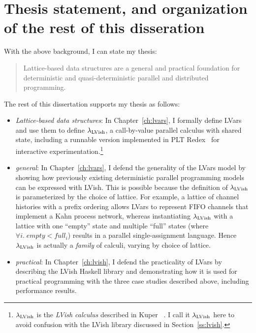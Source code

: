 \section{Thesis statement, and organization of the rest of this disseration}\label{s:thesis}

With the above background, I can state my thesis:
\begin{quote}
  Lattice-based data structures are a general and practical foundation
  for deterministic and quasi-deterministic parallel and distributed
  programming.
\end{quote}
The rest of this dissertation supports my thesis as follows:
\begin{itemize}
  \item \emph{Lattice-based data structures}: In Chapter~\ref{ch:lvars}, I formally define
    LVars and use them to define $\lambda_{\textrm{LVish}}$, a call-by-value
    parallel calculus with shared state, including a runnable version
    implemented in PLT Redex~\cite{redex-book} for interactive
    experimentation.\footnote{$\lambda_{\textrm{LVish}}$ is the \emph{LVish
        calculus} described in Kuper \etal~\cite{Freeze-paper}.  I
      call it $\lambda_{\textrm{LVish}}$ here to avoid confusion with the LVish
      library discussed in Section~\ref{ss:lvish}.}

  \item \emph{general}: In Chapter~\ref{ch:lvars}, I defend the generality of the LVars
    model by showing how previously existing deterministic parallel
    programming models can be expressed with LVish.  This is possible
    because the definition of $\lambda_{\textrm{LVish}}$ is parameterized by the
    choice of lattice.  For example, a lattice of channel histories
    with a prefix ordering allows LVars to represent FIFO channels
    that implement a Kahn process network, whereas instantiating
    $\lambda_{\textrm{LVish}}$ with a lattice with one ``empty'' state and
    multiple ``full'' states (where $\forall{i}.\; \mathit{empty} <
    \mathit{full_i}$) results in a parallel single-assignment
    language.  Hence $\lambda_{\textrm{LVish}}$ is actually a \emph{family} of
    calculi, varying by choice of lattice.

  \item \emph{practical}: In Chapter~\ref{ch:lvish}, I defend the practicality of LVars by
    describing the LVish Haskell library and demonstrating how it is
    used for practical programming with the three case studies
    described above, including performance results.


\end{itemize}
